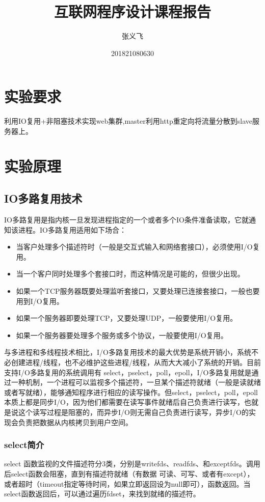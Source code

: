\documentclass{article}
\title{互联网程序设计课程报告}
\author{张义飞}
\date{201821080630}
\begin{document}
\maketitle

\section{实验要求}
\begin{question}
利用IO复用+非阻塞技术实现web集群,master利用http重定向将流量分散到slave服务器上。
\end{question}

\section{实验原理}
\subsection{IO多路复用技术}
IO多路复用是指内核一旦发现进程指定的一个或者多个IO条件准备读取，它就通知该进程。IO多路复用适用如下场合：
\begin{itemize}
    \item 当客户处理多个描述符时（一般是交互式输入和网络套接口），必须使用I/O复用。
    \item 当一个客户同时处理多个套接口时，而这种情况是可能的，但很少出现。
    \item 如果一个TCP服务器既要处理监听套接口，又要处理已连接套接口，一般也要用到I/O复用。
    \item 如果一个服务器即要处理TCP，又要处理UDP，一般要使用I/O复用。
    \item 如果一个服务器要处理多个服务或多个协议，一般要使用I/O复用。
\end{itemize}

与多进程和多线程技术相比，I/O多路复用技术的最大优势是系统开销小，系统不必创建进程/线程，也不必维护这些进程/线程，从而大大减小了系统的开销。目前支持I/O多路复用的系统调用有 select，pselect，poll，epoll，I/O多路复用就是通过一种机制，一个进程可以监视多个描述符，一旦某个描述符就绪（一般是读就绪或者写就绪），能够通知程序进行相应的读写操作。但select，pselect，poll，epoll本质上都是同步I/O，因为他们都需要在读写事件就绪后自己负责进行读写，也就是说这个读写过程是阻塞的，而异步I/O则无需自己负责进行读写，异步I/O的实现会负责把数据从内核拷贝到用户空间。

\subsubsection{select简介}
select 函数监视的文件描述符分3类，分别是writefds、readfds、和exceptfds。调用后select函数会阻塞，直到有描述符就绪（有数据 可读、可写、或者有except），或者超时（timeout指定等待时间，如果立即返回设为null即可），函数返回。当select函数返回后，可以通过遍历fdset，来找到就绪的描述符。
\end{document}

